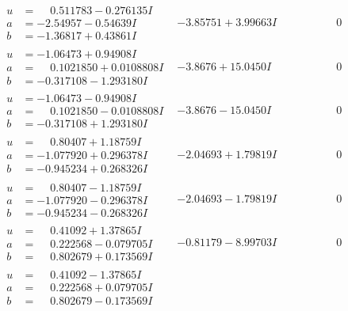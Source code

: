 \documentclass[1p]{elsarticle_modified}
\theoremstyle{definition}
\begin{document}
$$\begin{array}{c|c|c}
 \hline 
\begin{aligned}
u &= \phantom{-}0.511783 - 0.276135 I \\
a &= -2.54957 - 0.54639 I \\
b &= -1.36817 + 0.43861 I\end{aligned}
 & -3.85751 + 3.99663 I & \phantom{-0.000000 } 0 \\ \hline\begin{aligned}
u &= -1.06473 + 0.94908 I \\
a &= \phantom{-}0.1021850 + 0.0108808 I \\
b &= -0.317108 - 1.293180 I\end{aligned}
 & -3.8676 + 15.0450 I & \phantom{-0.000000 } 0 \\ \hline\begin{aligned}
u &= -1.06473 - 0.94908 I \\
a &= \phantom{-}0.1021850 - 0.0108808 I \\
b &= -0.317108 + 1.293180 I\end{aligned}
 & -3.8676 - 15.0450 I & \phantom{-0.000000 } 0 \\ \hline\begin{aligned}
u &= \phantom{-}0.80407 + 1.18759 I \\
a &= -1.077920 + 0.296378 I \\
b &= -0.945234 + 0.268326 I\end{aligned}
 & -2.04693 + 1.79819 I & \phantom{-0.000000 } 0 \\ \hline\begin{aligned}
u &= \phantom{-}0.80407 - 1.18759 I \\
a &= -1.077920 - 0.296378 I \\
b &= -0.945234 - 0.268326 I\end{aligned}
 & -2.04693 - 1.79819 I & \phantom{-0.000000 } 0 \\ \hline\begin{aligned}
u &= \phantom{-}0.41092 + 1.37865 I \\
a &= \phantom{-}0.222568 - 0.079705 I \\
b &= \phantom{-}0.802679 + 0.173569 I\end{aligned}
 & -0.81179 - 8.99703 I & \phantom{-0.000000 } 0 \\ \hline\begin{aligned}
u &= \phantom{-}0.41092 - 1.37865 I \\
a &= \phantom{-}0.222568 + 0.079705 I \\
b &= \phantom{-}0.802679 - 0.173569 I\end{aligned}

\end{array}$$
\end{document}
